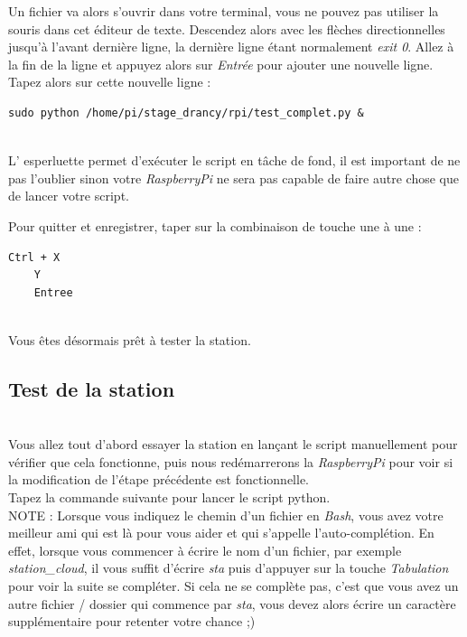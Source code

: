 Un fichier va alors s'ouvrir dans votre terminal, vous ne pouvez pas utiliser la souris dans cet éditeur de texte. Descendez alors avec les flèches directionnelles jusqu'à l'avant dernière ligne, la dernière ligne étant normalement \textit{exit 0}. Allez à la fin de la ligne et appuyez alors sur \textit{Entrée} pour ajouter une nouvelle ligne. 
\\
Tapez alors sur cette nouvelle ligne :\\

\begin{lstlisting}[style=MyBashStyle]
	sudo python /home/pi/stage_drancy/rpi/test_complet.py &
\end{lstlisting}\\

L' esperluette permet d'exécuter le script en tâche de fond, il est important de ne pas l'oublier sinon votre \textit{RaspberryPi} ne sera pas capable de faire autre chose que de lancer votre script.

Pour quitter et enregistrer, taper sur la combinaison de touche une à une :\\

\begin{lstlisting}[style=MyBashStyle]
	Ctrl + X
	Y
	Entree
\end{lstlisting}\\

Vous êtes désormais prêt à tester la station.

\subsection{Test de la station}\\

Vous allez tout d'abord essayer la station en lançant le script manuellement pour vérifier que cela fonctionne, puis nous redémarrerons la \textit{RaspberryPi} pour voir si la modification de l'étape précédente est fonctionnelle.\\

Tapez la commande suivante pour lancer le script python.\\

NOTE : Lorsque vous indiquez le chemin d'un fichier en \textit{Bash}, vous avez votre meilleur ami qui est là pour vous aider et qui s'appelle l'auto-complétion. En effet, lorsque vous commencer à écrire le nom d'un fichier, par exemple \textit{station_cloud}, il vous suffit d'écrire \textit{sta} puis d'appuyer sur la touche \textit{Tabulation} pour voir la suite se compléter. Si cela ne se complète pas, c'est que vous avez un autre fichier / dossier qui commence par \textit{sta}, vous devez alors écrire un caractère supplémentaire pour retenter votre chance ;)\\

